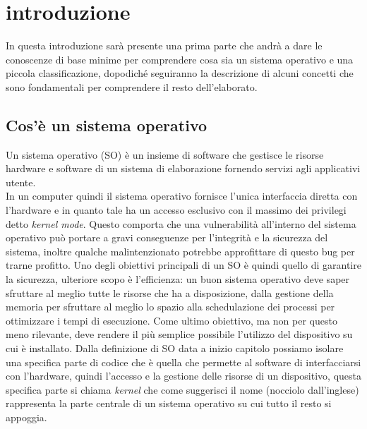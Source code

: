 \chapter{introduzione}
In questa introduzione sarà presente una prima parte che andrà a dare le conoscenze di base minime per comprendere cosa sia un sistema operativo e una piccola classificazione, dopodiché seguiranno la descrizione di alcuni concetti che sono fondamentali per comprendere il resto dell'elaborato.

\section{Cos'è un sistema operativo}
Un sistema operativo (SO) è un insieme di software che gestisce le risorse hardware e software di un sistema di elaborazione fornendo servizi agli applicativi utente.\\
In un computer quindi il sistema operativo fornisce l'unica interfaccia diretta con l'hardware e in quanto tale ha un accesso esclusivo con il massimo dei privilegi detto \textit{kernel mode}. Questo comporta che una vulnerabilità all'interno del sistema operativo può portare a gravi conseguenze per l'integrità e la sicurezza del sistema, inoltre qualche malintenzionato potrebbe approfittare di questo bug per trarne profitto.
Uno degli obiettivi principali di un SO è quindi quello di garantire la sicurezza, ulteriore scopo è l'efficienza: un buon sistema operativo deve saper sfruttare al meglio tutte le risorse che ha a disposizione, dalla gestione della memoria per sfruttare al meglio lo spazio alla schedulazione dei processi per ottimizzare i tempi di esecuzione. Come ultimo obiettivo, ma non per questo meno rilevante, deve rendere il più semplice possibile l'utilizzo del dispositivo su cui è installato.
Dalla definizione di SO data a inizio capitolo possiamo isolare una specifica parte di codice che è quella che permette al software di interfacciarsi con l'hardware, quindi l'accesso e la gestione delle risorse di un dispositivo, questa specifica parte si chiama \textit{kernel} che come suggerisci il nome (nocciolo dall'inglese) rappresenta la parte centrale di un sistema operativo su cui tutto il resto si appoggia.\\
\newpage

